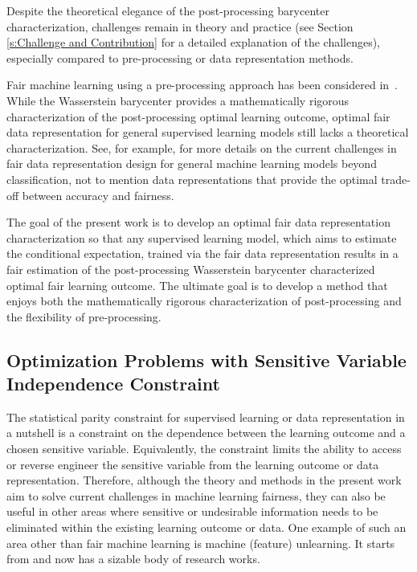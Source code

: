 \documentclass[twoside,11pt]{article}
\begin{document}
Despite the theoretical elegance of the post-processing barycenter characterization, challenges remain in theory and practice (see Section \ref{s:Challenge and Contribution} for a detailed explanation of the challenges), especially compared to pre-processing or data representation methods.

Fair machine learning using a pre-processing approach has been considered in~\cite{calmon2017optimized,feldman2015certifying, hajian2012methodology, silvia2020general, kamiran2012data}. While the Wasserstein barycenter provides a mathematically rigorous characterization of the post-processing optimal learning outcome, optimal fair data representation for general supervised learning models still lacks a theoretical characterization. See, for example, \cite[Section 3.4, 3.5]{chouldechova2018frontiers} for more details on the current challenges in fair data representation design for general machine learning models beyond classification, not to mention data representations that provide the optimal trade-off between accuracy and fairness.

The goal of the present work is to develop an optimal fair data representation characterization so that any supervised learning model, which aims to estimate the conditional expectation, trained via the fair data representation results in a fair estimation of the post-processing Wasserstein barycenter characterized optimal fair learning outcome. The ultimate goal is to develop a method that enjoys both the mathematically rigorous characterization of post-processing and the flexibility of pre-processing.

\subsection{Optimization Problems with Sensitive Variable Independence Constraint} \label{s:Theoretical Contribution}

The statistical parity constraint for supervised learning or data representation in a nutshell is a constraint on the dependence between the learning outcome and a chosen sensitive variable. Equivalently, the constraint limits the ability to access or reverse engineer the sensitive variable from the learning outcome or data representation. Therefore, although the theory and methods in the present work aim to solve current challenges in machine learning fairness, they can also be useful in other areas where sensitive or undesirable information needs to be eliminated within the existing learning outcome or data. One example of such an area other than fair machine learning is machine (feature) unlearning. It starts from \cite{cao2015towards} and now has a sizable body of research works.
\end{document}
